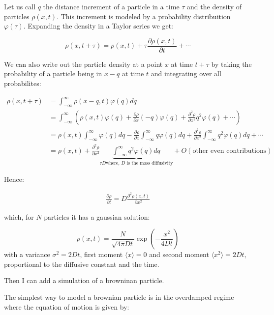 \documentclass[a4paper]{article}
\begin{document}
Let us call $q$ the distance increment of a particle in a time $\tau$ and the density of particles $\rho(x,t)$. This increment is modeled by a probability distribuition $\varphi(\tau)$. Expanding the density in a Taylor series we get:

\begin{equation}
	\rho(x,t+\tau) = \rho(x,t) +  \tau \frac{\partial \rho(x,t)}{\partial t} + \cdots
\end{equation}

We can also write out the particle density at a point $x$ at time $t+\tau$ by taking the probability of a particle being in $x-q$ at time $t$ and integrating over all probabilites:

\begin{align}
	\rho(x,t+\tau) &= \int_{-\infty}^\infty \rho(x-q,t)\varphi(q)dq \\
	&= \int_{-\infty}^\infty \left(\rho(x,t)\varphi(q) + \frac{\partial \rho}{\partial x} (-q)\varphi(q) + \frac{\partial^2\rho}{\partial x^2}q^2\varphi(q) + \cdots\right) \\
	&= \rho(x,t)\int_{-\infty}^\infty \varphi(q)dq - \frac{\partial \rho}{\partial x} \int_{-\infty}^\infty q\varphi(q)dq + \frac{\partial^2\rho}{\partial x^2}\int_{-\infty}^{\infty} q^2\varphi(q)dq + \cdots \\
	&= \rho(x,t) + \frac{\partial^2\rho}{\partial x^2} \underbrace{\int_{-\infty}^\infty q^2\varphi(q)dq}_{\tau D \textrm{where, $D$ is the mass diffusivity}} + O(\textrm{other even contributions})
\end{align}

Hence:

\begin{align}
	\frac{\partial \rho}{\partial t}=D\frac{\partial^2 \rho(x,t)}{\partial x^2}
\end{align}

which, for $N$ particles it has a gaussian solution:

\begin{equation}
	\rho(x,t) = \frac{N}{\sqrt{4\pi Dt}}\exp\left(-\frac{x^2}{4Dt}\right)
\end{equation}
%
with a variance $\sigma^2= 2Dt$, first moment $\langle x \rangle = 0$ and second moment $\langle x^2 \rangle = 2Dt$, proportional to the diffusive constant and the time.

Then I can add a simulation of a browninan particle.

The simplest way to model a brownian particle is in the overdamped regime where the equation of motion is given by:
\end{document}
